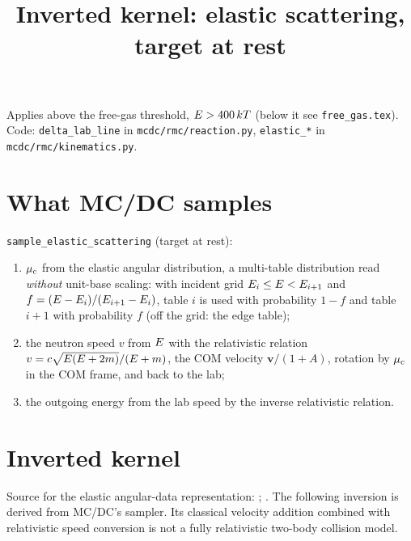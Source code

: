 \documentclass[11pt]{article}
\title{Inverted kernel: elastic scattering, target at rest}
\date{}
\begin{document}
\maketitle

\noindent Applies above the free-gas threshold, $E > 400\,kT$ (below it see
\texttt{free\_gas.tex}). Code: \texttt{delta\_lab\_line} in
\texttt{mcdc/rmc/reaction.py}, \texttt{elastic\_*} in \texttt{mcdc/rmc/kinematics.py}.

\section{What MC/DC samples}

\texttt{sample\_elastic\_scattering} (target at rest):
\begin{enumerate}
  \item $\mu_{c}$ from the elastic angular distribution, a multi-table distribution read
  \emph{without} unit-base scaling: with incident grid $E_i \le E < E_{i+1}$ and
  $f = (E - E_i)/(E_{i+1} - E_i)$, table $i$ is used with probability $1-f$ and
  table $i+1$ with probability $f$ (off the grid: the edge table);
  \item the neutron speed $v$ from $E$ with the relativistic relation
  $v = c\sqrt{E(E + 2m)}/(E + m)$, the COM velocity $\bm v/(1+A)$, rotation
  by $\mu_{c}$ in the COM frame, and back to the lab;
  \item the outgoing energy from the lab speed by the inverse relativistic relation.
\end{enumerate}

\section{Inverted kernel}

\noindent Source for the elastic angular-data representation:
; . The following inversion is derived
from MC/DC's sampler. Its classical velocity addition combined with relativistic
speed conversion is not a fully relativistic two-body collision model.
\end{document}
